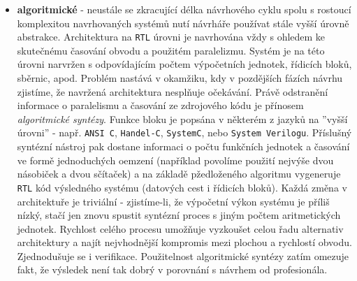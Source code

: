 {\begin{itemize}
              obvodu na relativně vysoké úrovni abstrakce, přičemž jeden řádek zdrojového kódu je v 
              hardware reprezentován typicky desítkami/stovkami hradel. To zvyšuje produktivitu 
              práce, zpřehledňuje vlastní návrh, zjednodušuje přenos návrhu mezi různými 
              technologiemi a zrychluje jak vlastní návrh, tak pozdější opravy. Jedinou 
              nevý\-ho\-dou je nevhodnost pro ryze asynchronní návrh, to ale není při práci s     
              hrad\-lo\-vý\-mi poli omezující, neboť hradlová pole jsou určena právě pro synchronní 
              číslicové obvody.
        \item \textbf{algoritmické} - neustále se zkracující délka návrhového cyklu spolu s  
              rostoucí komplexitou navrhovaných systémů nutí návrháře používat stále vyšší úrovně 
              abstrakce. Architektura na \texttt{RTL} úrovni je navrhována vždy s ohledem ke 
              skutečnému časování obvodu a použitém paralelizmu. Systém je na této úrovni narvržen 
              s odpovídajícím počtem výpočetních jednotek, řídicích bloků, sběrnic, apod. Problém 
              nastává v okamžiku, kdy v pozdějších fázích návrhu zjistíme, že navržená architektura 
              nesplňuje očekávání. Právě od\-stra\-ně\-ní informace o paralelismu a časování ze 
              zdrojového kódu je přínosem \emph{algoritmické syntézy}. Funkce bloku je popsána v 
              některém z jazyků na ''vyšší úrovni'' - např. \texttt{ANSI C}, \texttt{Handel-C}, 
              \texttt{SystemC}, nebo \texttt{System Verilogu}. Příslušný syntézní nástroj pak    
              dostane informaci o počtu funkčních jednotek a časování ve formě jednoduchých oemzení 
              (například povolíme použití nejvýše dvou násobiček a dvou sčítaček) a na základě 
              pžedloženého algoritmu vygeneruje \texttt{RTL} kód výsledného systému (datových cest 
              i řídicích bloků). Kaž\-dá změna v architektuře je triviální - zjistíme-li, že 
              výpočetní výkon systému je příliš nízký, stačí jen znovu spustit syntézní proces s 
              jiným počtem aritmetických jednotek. Rychlost celého procesu umožňuje vyzkoušet celou 
              řadu alternativ architektury a najít nejvhodnější kompromis mezi plochou a rychlostí 
              obvodu. Zjednodušuje se i verifikace. Použitelnost algoritmické syntézy zatím omezuje 
              fakt, že výsledek není tak dobrý v porovnání s návrhem od profesionála. 
      \end{itemize}
}
